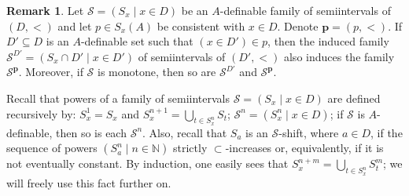 \documentclass{amsart}
\theoremstyle{definition}
\theoremstyle{definition}
\newtheorem{Remark}[Theorem]{Remark}
\begin{document}
\begin{Remark}\label{Remark definable extension of a definable extension}
Let $\mathcal S=(S_x\mid x\in D)$ be an $A$-definable family of semiintervals of $(D,<)$ and let $p\in S_x(A)$ be consistent with $x\in D$. Denote $\mathbf p=(p,<)$.
If $D'\subseteq D$ is an $A$-definable set such that $(x\in D')\in p$, then the induced family $\mathcal S^{D'}=(S_x\cap D'\mid x\in D')$ of semiintervals of $(D',<)$ also induces the family $\mathcal S^{\mathbf p}$. Moreover, if $\mathcal S$ is monotone, then so are $\mathcal S^{D'}$ and $\mathcal S^{\mathbf p}$. 
\end{Remark}



Recall that powers of a family of semiintervals $\mathcal S=(S_x\mid x\in D)$
are defined recursively by: $S_x^1=S_x$ and $S^{n+1}_x=\bigcup_{t\in S_x^n}S_t$; $\mathcal S^n=(S_x^n\mid x\in D)$; if $\mathcal S$ is $A$-definable, then so is each $\mathcal S^n$. Also, recall that $S_a$ is an $\mathcal S$-shift, where $a\in D$, if the sequence of powers $(S_a^n\mid n\in\mathbb N)$ strictly $\subset$-increases or, equivalently, if it is not eventually constant. By induction, one easily sees that $S^{n+m}_x=\bigcup_{t\in S_x^n}S_t^m$; we will freely use this fact further on. 
\end{document}
